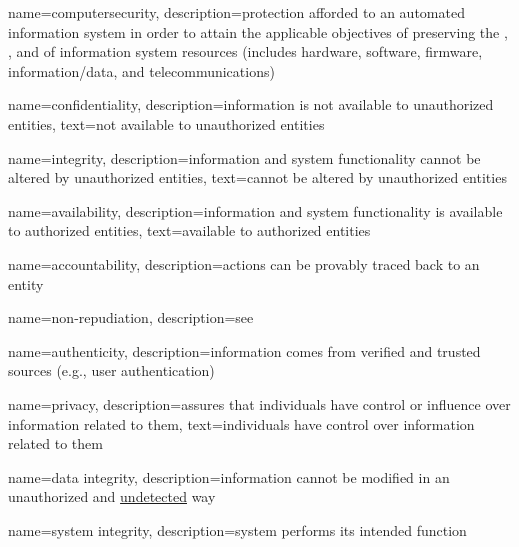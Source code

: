 {\glsentrytext{\glslabel}}%
{\glsentryshortname}%
{\Glsentryshortname}%
{\glsshortname}%
{\Glsshortname}%
{\GLSshortname}%


{
    name=computersecurity,
    description={protection afforded to an automated information system in order to attain the applicable objectives of preserving the , , and  of information system resources (includes hardware, software, firmware, information/data, and telecommunications)}
}

{
    name=confidentiality,
    description={information is not available to unauthorized entities},
    text={not available to unauthorized entities}
}

{
    name=integrity,
    description={information and system functionality cannot be altered by unauthorized entities},
    text={cannot be altered by unauthorized entities}
}

{
    name=availability,
    description={information and system functionality is available to authorized entities},
    text={available to authorized entities}
}

{
    name=accountability,
    description={actions can be provably traced back to an entity}
}

{
    name={non-repudiation},
    description={see }
}

{
    name={authenticity},
    description={information comes from verified and trusted sources (e.g., user authentication)}
}

{
    name={privacy},
    description={assures that individuals have control or influence over information related to them},
    text={individuals have control over information related to them}
}

{
    name={data integrity},
    description={information cannot be modified in an unauthorized and \underline{undetected} way}
}


{
    name={system integrity},
    description={system performs its intended function}
}

